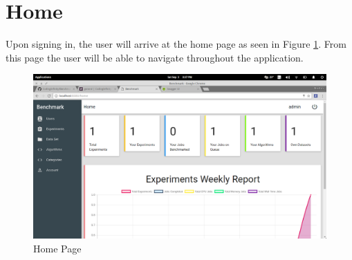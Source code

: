 \documentclass[11pt,a4paper]{article}
\begin{document}
\clearpage
\section{Home}
Upon signing in, the user will arrive at the home page as seen in Figure \ref{fig:homePage}. From this page the user will be able 
to navigate throughout the application.
\begin{figure}[H]
	\begin{center}
		\includegraphics[scale=0.3]{../Images/User Manual/Home Page.png}
		\caption{Home Page}
		\label{fig:homePage}
	\end{center}  
\end{figure}
\clearpage
\end{document}
